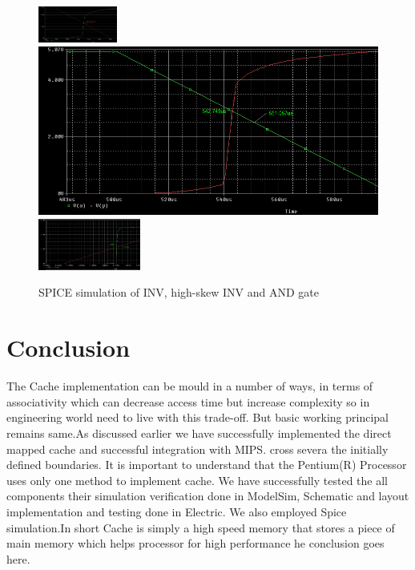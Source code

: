\documentclass[conference]{IEEEtran}
\begin{document}
\begin{figure}[h!]
  \centering
    \includegraphics[width=0.23\textwidth]{inv} \includegraphics[scale=0.14]{hi} \includegraphics[width=0.3\textwidth]{and}
  \caption{SPICE simulation of INV, high-skew INV and AND gate}
  \label{fig:Spice}
\end{figure}

\section{Conclusion}\label{conclusion}

The Cache implementation can be mould in a number of ways, in terms of associativity which can decrease access time but increase complexity so in engineering world need to live with this trade-off. But basic working principal remains same.As discussed earlier we have successfully implemented the direct mapped cache and successful integration with MIPS.
cross severa the initially defined boundaries. It is important to understand that the
Pentium(R) Processor uses only one method to implement cache. We have successfully tested the all components their simulation verification done in ModelSim, Schematic and layout implementation and testing done in Electric. We also employed Spice simulation.In short Cache is simply a high speed memory that stores a piece of main memory which helps processor for high performance
he conclusion goes here.
\end{document}
